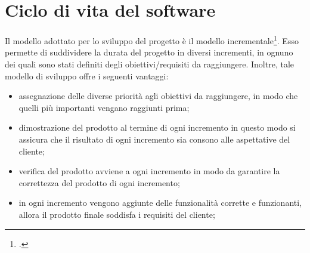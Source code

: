 

\section{Ciclo di vita del software}\label{sec:ciclo-vita-software}
Il modello adottato per lo sviluppo del progetto è il modello incrementale\footcite{womak:ingegneria-software}.
Esso permette di suddividere la durata del progetto in diversi incrementi, in ognuno dei quali sono stati definiti degli obiettivi/requisiti da raggiungere.
Inoltre, tale modello di sviluppo offre i seguenti vantaggi:
\begin{itemize}
    \item assegnazione delle diverse priorità agli obiettivi da raggiungere, in modo che quelli più importanti vengano raggiunti prima;
    \item dimostrazione del prodotto al termine di ogni incremento in questo modo si assicura che il risultato di ogni incremento sia consono alle aspettative del cliente;
    \item verifica del prodotto avviene a ogni incremento in modo da garantire la correttezza del prodotto di ogni incremento;
    \item in ogni incremento vengono aggiunte delle funzionalità corrette e funzionanti, allora il prodotto finale soddisfa i requisiti del cliente;
\end{itemize}
